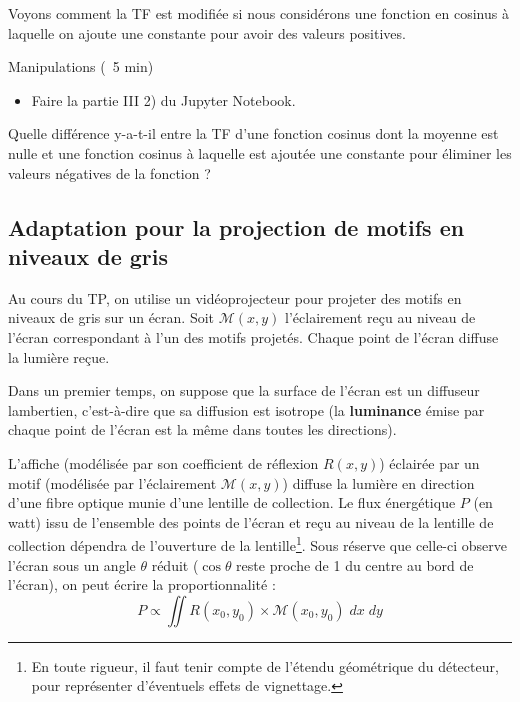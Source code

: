 \documentclass[a4paper,twoside,10pt]{book}
\begin{document}
Voyons comment la TF est modifiée si nous considérons une fonction en cosinus à laquelle on ajoute une constante pour avoir des valeurs positives.

\begin{bclogo}[noborder=true, logo = \bcoutil,barre = line]{Manipulations (\faClockO\ 5 min)}
\begin{itemize}[label=]
\item Faire la partie III 2) du Jupyter Notebook.
\end{itemize}
\end{bclogo}

\begin{question}[resume]
\item Quelle différence y-a-t-il entre la TF d'une fonction cosinus dont la moyenne est nulle et une fonction cosinus à laquelle est ajoutée une constante pour éliminer les valeurs négatives de la fonction ?
\end{question}

\subsection{Adaptation pour la projection de motifs en niveaux de gris}

Au cours du TP, on utilise un vidéoprojecteur pour projeter des motifs en niveaux de gris sur un écran. Soit $\mathcal{M}(x, y)$ l'éclairement reçu au niveau de l'écran correspondant à l'un des motifs projetés. Chaque point de l'écran diffuse la lumière reçue.

Dans un premier temps, on suppose que la surface de l'écran est un diffuseur lambertien, c'est-à-dire que sa diffusion est isotrope (la \textbf{luminance} émise par chaque point de l'écran est la même dans toutes les directions).

L'affiche (modélisée par son coefficient de réflexion $R(x,y)$) éclairée par un motif (modélisée par l'éclairement $\mathcal{M}(x, y)$) diffuse la lumière en direction d'une fibre optique munie d'une lentille de collection. Le flux énergétique $P$ (en watt) issu de l'ensemble des points de l'écran et reçu au niveau de la lentille de collection dépendra de l'ouverture de la lentille\footnote{En toute rigueur, il faut tenir compte de l'étendu géométrique du détecteur, pour représenter d'éventuels effets de vignettage.}. Sous réserve que celle-ci observe l'écran sous un angle $\theta$ réduit ($\cos \theta$ reste proche de 1 du centre au bord de l'écran), on peut écrire la proportionnalité :
\begin{equation}
P \propto \iint R(x_0, y_0) \times \mathcal{M}(x_0, y_0) \; dx \; dy
\end{equation}
\end{document}
